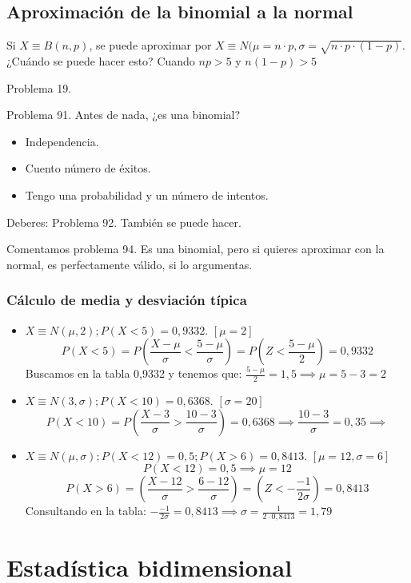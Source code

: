\subsection{Aproximación de la binomial a la normal}

Si $X\equiv B(n,p)$, se puede aproximar por $X\equiv N(\mu=n·p, \sigma=\sqrt{n·p·(1-p)}$. ¿Cuándo se puede hacer esto? Cuando $np>5$ y $n(1-p)>5$

Problema 19.

Problema 91. Antes de nada, ¿es una binomial? 
\begin{itemize}
	\item Independencia.
	\item Cuento número de éxitos.
	\item Tengo una probabilidad y un número de intentos.
\end{itemize}

Deberes: Problema 92. También se puede hacer.

Comentamos problema 94. Es una binomial, pero si quieres aproximar con la normal, es perfectamente válido, si lo argumentas.

\subsubsection{Cálculo de media y desviación típica}

\begin{itemize}
	\item $X\equiv N(\mu,2); P(X<5) = 0,9332$. $[\mu = 2]$
	\[
	P\left(X<5\right) = P\left(\frac{X-\mu}{\sigma}<\frac{5-\mu}{\sigma}\right) = P\left(Z<\frac{5-\mu}{2}\right) = 0,9332
	\]
	Buscamos en la tabla 0,9332 y tenemos que:
	$\frac{5-\mu}{2} = 1,5 \implies \mu=5-3=2$
	\item $X\equiv N(3,\sigma); P(X<10) = 0,6368$. $[\sigma = 20]$
	\[
		P\left(X<10\right) = P\left(\frac{X-3}{\sigma}>\frac{10-3}{\sigma}\right) =0,6368 \implies \frac{10-3}{\sigma}=0,35 \implies 
	\]
	\item $X\equiv N(\mu,\sigma); P(X<12) = 0,5; P(X>6) = 0,8413$. $[\mu = 12, \sigma = 6]$
	\[
		P(X<12) = 0,5 \implies \mu = 12
	\]
	\[
		P\left(X>6\right) = \left(\frac{X-12}{\sigma}>\frac{6-12}{\sigma}\right) = \left(Z<-\frac{-1}{2\sigma}\right) = 0,8413
	\]
	Consultando en la tabla: $-\frac{-1}{2\sigma} = 0,8413 \implies \sigma = \frac{1}{2·0,8413} = 1,79$
\end{itemize}


\section{Estadística bidimensional}

